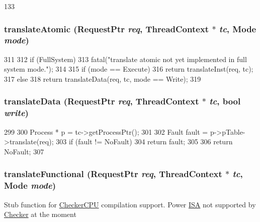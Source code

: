 \begin{DoxyCode}
133 {}
\end{DoxyCode}
\hypertarget{classPowerISA_1_1TLB_ad54e01e3c0a1613098a76b7f92e5be93}{
\subsubsection[{translateAtomic}]{ translateAtomic ({\bf RequestPtr} {\em req}, \/  {\bf ThreadContext} $\ast$ {\em tc}, \/  {\bf Mode} {\em mode})}}
\label{classPowerISA_1_1TLB_ad54e01e3c0a1613098a76b7f92e5be93}



\begin{DoxyCode}
311 {
312     if (FullSystem)
313         fatal("translate atomic not yet implemented in full system mode.\n");
314 
315     if (mode == Execute)
316         return translateInst(req, tc);
317     else
318         return translateData(req, tc, mode == Write);
319 }
\end{DoxyCode}
\hypertarget{classPowerISA_1_1TLB_ad54aef66412f77e2a15a621a126dfb52}{
\subsubsection[{translateData}]{ translateData ({\bf RequestPtr} {\em req}, \/  {\bf ThreadContext} $\ast$ {\em tc}, \/  bool {\em write})}}
\label{classPowerISA_1_1TLB_ad54aef66412f77e2a15a621a126dfb52}



\begin{DoxyCode}
299 {
300     Process * p = tc->getProcessPtr();
301 
302     Fault fault = p->pTable->translate(req);
303     if (fault != NoFault)
304         return fault;
305 
306     return NoFault;
307 }
\end{DoxyCode}
\hypertarget{classPowerISA_1_1TLB_a26658814c6c9034665aae19cf25545bb}{
\subsubsection[{translateFunctional}]{ translateFunctional ({\bf RequestPtr} {\em req}, \/  {\bf ThreadContext} $\ast$ {\em tc}, \/  {\bf Mode} {\em mode})}}
\label{classPowerISA_1_1TLB_a26658814c6c9034665aae19cf25545bb}
Stub function for \hyperlink{classCheckerCPU}{CheckerCPU} compilation support. Power \hyperlink{classPowerISA_1_1ISA}{ISA} not supported by \hyperlink{classChecker}{Checker} at the moment 


